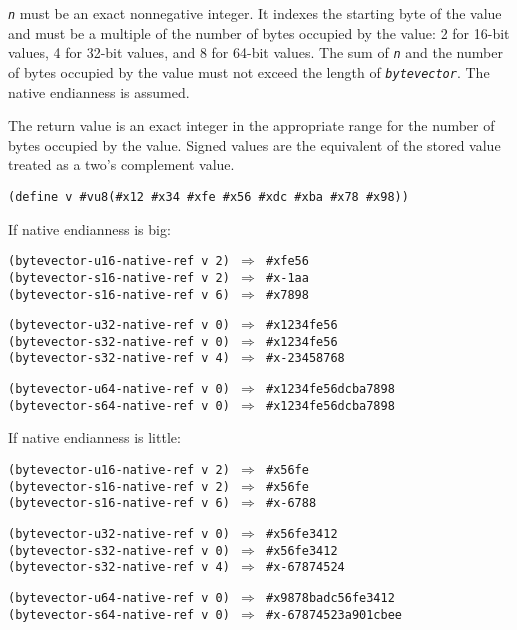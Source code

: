 \texttt{\textit{n}} must be an exact nonnegative integer.
It indexes the starting byte of the value and must be a multiple of the
number of bytes occupied by the value: 2 for 16-bit values, 4 for 32-bit
values, and 8 for 64-bit values.
The sum of \texttt{\textit{n}} and the number of bytes occupied by the value must
not exceed the length of \texttt{\textit{bytevector}}.
The native endianness is assumed.

The return value is an exact integer in the appropriate range for
the number of bytes occupied by the value.
Signed values are the equivalent of the stored value treated as a two's
complement value.


\texttt{(define v \#{}vu8(\#{}x12 \#{}x34 \#{}xfe \#{}x56 \#{}xdc \#{}xba \#{}x78 \#{}x98))}

If native endianness is big:


\begin{alltt}
(bytevector-u16-native-ref v 2) \(\Rightarrow\) \#{}xfe56
(bytevector-s16-native-ref v 2) \(\Rightarrow\) \#{}x-1aa
(bytevector-s16-native-ref v 6) \(\Rightarrow\) \#{}x7898

(bytevector-u32-native-ref v 0) \(\Rightarrow\) \#{}x1234fe56
(bytevector-s32-native-ref v 0) \(\Rightarrow\) \#{}x1234fe56
(bytevector-s32-native-ref v 4) \(\Rightarrow\) \#{}x-23458768

(bytevector-u64-native-ref v 0) \(\Rightarrow\) \#{}x1234fe56dcba7898
(bytevector-s64-native-ref v 0) \(\Rightarrow\) \#{}x1234fe56dcba7898
\end{alltt}


If native endianness is little:


\begin{alltt}
(bytevector-u16-native-ref v 2) \(\Rightarrow\) \#{}x56fe
(bytevector-s16-native-ref v 2) \(\Rightarrow\) \#{}x56fe
(bytevector-s16-native-ref v 6) \(\Rightarrow\) \#{}x-6788

(bytevector-u32-native-ref v 0) \(\Rightarrow\) \#{}x56fe3412
(bytevector-s32-native-ref v 0) \(\Rightarrow\) \#{}x56fe3412
(bytevector-s32-native-ref v 4) \(\Rightarrow\) \#{}x-67874524

(bytevector-u64-native-ref v 0) \(\Rightarrow\) \#{}x9878badc56fe3412
(bytevector-s64-native-ref v 0) \(\Rightarrow\) \#{}x-67874523a901cbee
\end{alltt}

